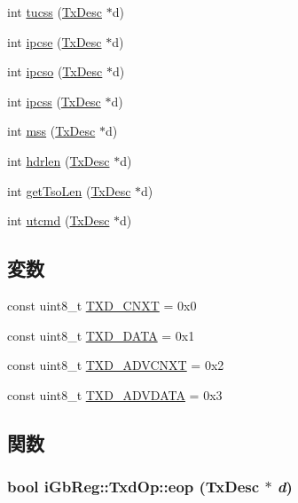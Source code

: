 \begin{DoxyCompactItemize}
\item 
int \hyperlink{namespaceiGbReg_1_1TxdOp_a409b5433c1fa1dbf05aded9da4d90622}{tucss} (\hyperlink{structiGbReg_1_1TxDesc}{TxDesc} $\ast$d)
\item 
int \hyperlink{namespaceiGbReg_1_1TxdOp_a94ed3e1271c637556a5c15cf582f8214}{ipcse} (\hyperlink{structiGbReg_1_1TxDesc}{TxDesc} $\ast$d)
\item 
int \hyperlink{namespaceiGbReg_1_1TxdOp_ab7b81a0cb8761fae8af2a578e4b0bb05}{ipcso} (\hyperlink{structiGbReg_1_1TxDesc}{TxDesc} $\ast$d)
\item 
int \hyperlink{namespaceiGbReg_1_1TxdOp_a05698994ed2909120e188568af94c622}{ipcss} (\hyperlink{structiGbReg_1_1TxDesc}{TxDesc} $\ast$d)
\item 
int \hyperlink{namespaceiGbReg_1_1TxdOp_a3c9424fedfd3337a1fbe2fdb133cec01}{mss} (\hyperlink{structiGbReg_1_1TxDesc}{TxDesc} $\ast$d)
\item 
int \hyperlink{namespaceiGbReg_1_1TxdOp_a56155a1a3846877b600c56961f9ce28d}{hdrlen} (\hyperlink{structiGbReg_1_1TxDesc}{TxDesc} $\ast$d)
\item 
int \hyperlink{namespaceiGbReg_1_1TxdOp_a48e87927f1617006b0965381efcf5dfd}{getTsoLen} (\hyperlink{structiGbReg_1_1TxDesc}{TxDesc} $\ast$d)
\item 
int \hyperlink{namespaceiGbReg_1_1TxdOp_a9cfaa8cb088f6ce63b22853cd0e920bf}{utcmd} (\hyperlink{structiGbReg_1_1TxDesc}{TxDesc} $\ast$d)
\end{DoxyCompactItemize}
\subsection*{変数}
\begin{DoxyCompactItemize}
\item 
const uint8\_\-t \hyperlink{namespaceiGbReg_1_1TxdOp_a134b13753f53fae4712f0cf445beb0fe}{TXD\_\-CNXT} = 0x0
\item 
const uint8\_\-t \hyperlink{namespaceiGbReg_1_1TxdOp_a489d6c941b18bbb3bd7e7cd54c9774f6}{TXD\_\-DATA} = 0x1
\item 
const uint8\_\-t \hyperlink{namespaceiGbReg_1_1TxdOp_a715b843e900b8ccb187c30b76c8643b7}{TXD\_\-ADVCNXT} = 0x2
\item 
const uint8\_\-t \hyperlink{namespaceiGbReg_1_1TxdOp_a97280b2931b22cb8a343e91ee6d0fd80}{TXD\_\-ADVDATA} = 0x3
\end{DoxyCompactItemize}


\subsection{関数}
\hypertarget{namespaceiGbReg_1_1TxdOp_a0e51e7a024606345d359fc17d3af7c9c}{
\subsubsection[{eop}]{\setlength{\rightskip}{0pt plus 5cm}bool iGbReg::TxdOp::eop (TxDesc $\ast$ {\em d})}}
\label{namespaceiGbReg_1_1TxdOp_a0e51e7a024606345d359fc17d3af7c9c}



